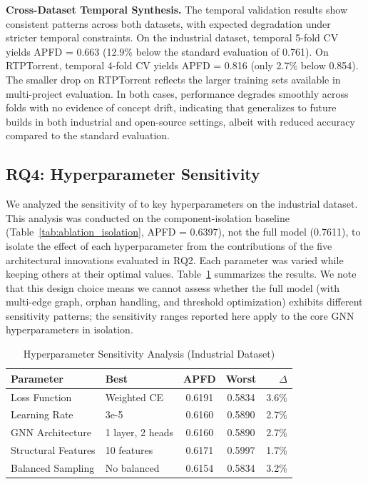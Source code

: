 \textbf{Cross-Dataset Temporal Synthesis.}
The temporal validation results show consistent patterns across both datasets,
with expected degradation under stricter temporal constraints. On the
industrial dataset, temporal 5-fold CV yields APFD = 0.663 (12.9\% below the
standard evaluation of 0.761). On RTPTorrent, temporal 4-fold CV yields
APFD = 0.816 (only 2.7\% below 0.854). The smaller drop on RTPTorrent
reflects the larger training sets available in multi-project evaluation. In
both cases, performance degrades smoothly across folds with no evidence
of concept drift, indicating that \filopriori{} generalizes to future builds
in both industrial and open-source settings, albeit with reduced accuracy
compared to the standard evaluation.


\subsection{RQ4: Hyperparameter Sensitivity}
\label{sec:rq4}

We analyzed the sensitivity of \filopriori{} to key hyperparameters on the
industrial dataset. This analysis was conducted on the component-isolation
baseline (Table~\ref{tab:ablation_isolation}, APFD = 0.6397), not the full
model (0.7611), to isolate the effect of each hyperparameter from the
contributions of the five architectural innovations evaluated in RQ2. Each
parameter was varied while keeping others at their optimal values.
Table~\ref{tab:sensitivity} summarizes the results. We note that this
design choice means we cannot assess whether the full model (with multi-edge
graph, orphan handling, and threshold optimization) exhibits different
sensitivity patterns; the sensitivity ranges reported here apply to the
core GNN hyperparameters in isolation.

\begin{table}[!t]
\centering
\caption{Hyperparameter Sensitivity Analysis (Industrial Dataset)}
\label{tab:sensitivity}
\scriptsize
\begin{tabular}{llccr}
\toprule
\textbf{Parameter} & \textbf{Best} & \textbf{APFD} & \textbf{Worst} & \textbf{$\Delta$} \\
\midrule
Loss Function & Weighted CE & 0.6191 & 0.5834 & 3.6\% \\
Learning Rate & 3e-5 & 0.6160 & 0.5890 & 2.7\% \\
GNN Architecture & 1 layer, 2 heads & 0.6160 & 0.5890 & 2.7\% \\
Structural Features & 10 features & 0.6171 & 0.5997 & 1.7\% \\
Balanced Sampling & No balanced & 0.6154 & 0.5834 & 3.2\% \\
\bottomrule
\end{tabular}
\end{table}

